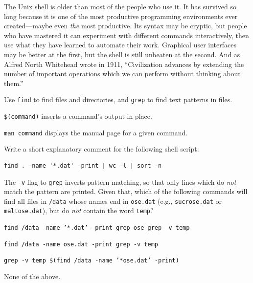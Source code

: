 \documentclass{book}
\begin{document}
The Unix shell is older than most of the people who use it. It has
survived so long because it is one of the most productive programming
environments ever created---maybe even \emph{the} most productive. Its
syntax may be cryptic, but people who have mastered it can experiment
with different commands interactively, then use what they have learned
to automate their work. Graphical user interfaces may be better at the
first, but the shell is still unbeaten at the second. And as Alfred
North Whitehead wrote in 1911, ``Civilization advances by extending the
number of important operations which we can perform without thinking
about them.''

\begin{keypoints}
\begin{swcitemize}
\item
  Use \texttt{find} to find files and directories, and \texttt{grep} to
  find text patterns in files.
\item
  \texttt{\$(command)} inserts a command's output in place.
\item
  \texttt{man command} displays the manual page for a given command.
\end{swcitemize}
\end{keypoints}

\begin{challenge}
  Write a short explanatory comment for the following shell script:

\begin{verbatim}
find . -name '*.dat' -print | wc -l | sort -n
\end{verbatim}
\end{challenge}

\begin{challenge}
  The \texttt{-v} flag to \texttt{grep} inverts pattern matching, so
  that only lines which do \emph{not} match the pattern are printed.
  Given that, which of the following commands will find all files in
  \texttt{/data} whose names end in \texttt{ose.dat} (e.g.,
  \texttt{sucrose.dat} or \texttt{maltose.dat}), but do \emph{not}
  contain the word \texttt{temp}?

  \begin{swcenumerate}
  \item
    \texttt{find /data -name '*.dat' -print \textbar{} grep ose \textbar{} grep -v temp}
  \item
    \texttt{find /data -name ose.dat -print \textbar{} grep -v temp}
  \item
    \texttt{grep -v temp \$(find /data -name '*ose.dat' -print)}
  \item
    None of the above.
  \end{swcenumerate}
\end{challenge}
\end{document}
